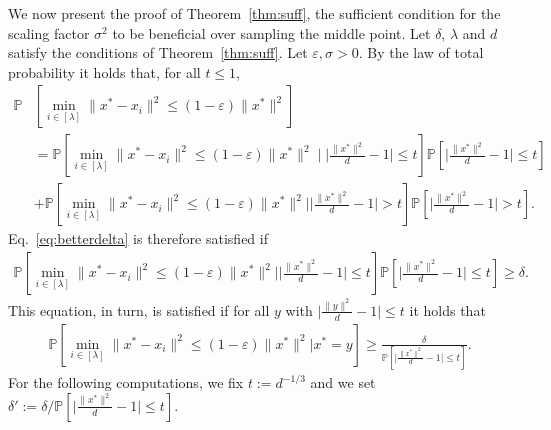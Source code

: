 \begin{subappendices}
\begin{prv*}
We now present the proof of Theorem~\ref{thm:suff}, the sufficient condition for the scaling factor $\sigma^2$ to be beneficial over sampling the middle point. 
Let $\delta$, $\lambda$ and $d$ satisfy the conditions of Theorem~\ref{thm:suff}. 
Let $\varepsilon,\sigma>0$. By the law of total probability it holds that, for all $t\leq 1$,  
\begin{align*}
  \mathbb{P}&\left[\min_{i\in[\lambda]}\lVert x^*-x_i\rVert^2 \leq \left(1-\varepsilon\right)\lVert x^*\rVert^2\right] \\ &=\mathbb{P}\left[\min_{i\in[\lambda]}\lVert x^*-x_i\rVert^2 \leq \left(1-\varepsilon\right)\lVert x^*\rVert^2 \mid \lvert\frac{\lVert x^*\rVert^2}{d}-1\rvert\leq t\right]
  \mathbb{P}\left[\lvert\frac{\lVert x^*\rVert^2}{d}-1\rvert\leq t\right]\\
  &+\mathbb{P}\left[\min_{i\in[\lambda]}\lVert x^*-x_i\rVert^2 \leq \left(1-\varepsilon\right)\lVert x^*\rVert^2\big| \lvert\frac{\lVert x^*\rVert^2}{d}-1\rvert> t\right]
  \mathbb{P}\left[\lvert\frac{\lVert x^*\rVert^2}{d}-1\rvert> t\right].
\end{align*}
Eq.~\ref{eq:betterdelta} is therefore satisfied if 
\begin{eqnarray*}
\mathbb{P}\left[\min_{i\in[\lambda]}\lVert x^*-x_i\rVert^2 \leq \left(1-\varepsilon\right)\lVert x^*\rVert^2\big| \lvert\frac{\lVert x^*\rVert^2}{d}-1\rvert\leq t\right]
  \mathbb{P}\left[\lvert\frac{\lVert x^*\rVert^2}{d}-1\rvert\leq t\right]\geq \delta.
\end{eqnarray*}
This equation, in turn, is satisfied if for all $y$ with $\lvert\frac{\rVert y\rVert^2}{d}-1\rvert\leq t$ it holds that
\begin{eqnarray}
\mathbb{P}\left[\min_{i\in[\lambda]}\lVert x^*-x_i\rVert^2 \leq \left(1-\varepsilon\right)\lVert x^*\rVert^2\big|x^*=y\right]
\geq \frac{\delta}{\mathbb{P}\left[\lvert\frac{\lVert x^*\rVert^2}{d}-1\rvert\leq t\right]}.
\label{eq:suff2}
\end{eqnarray}
For the following computations, we fix $t:=d^{-1/3}$ and we set $\delta':=\delta/\mathbb{P}\left[\lvert\frac{\lVert x^*\rVert^2}{d}-1\rvert\leq t\right]$.


\end{prv*}
\end{subappendices}
